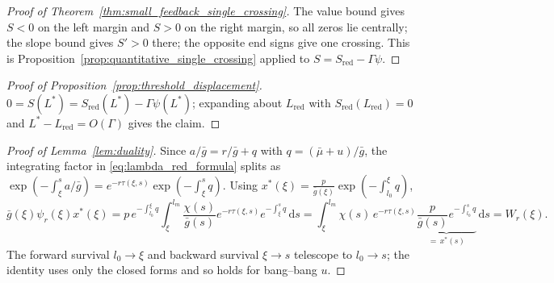 \documentclass[pdflatex,sn-mathphys-num]{sn-jnl}
\newcommand{\dd}{\,\mathrm{d}}
\theoremstyle{plain}
\theoremstyle{definition}
\theoremstyle{remark}
\begin{document}
\begin{proof}[Proof of Theorem~\ref{thm:small_feedback_single_crossing}]
The value bound gives $S<0$ on the left margin and $S>0$ on the right margin, so
all zeros lie centrally; the slope bound gives $S'>0$ there; the opposite end
signs give one crossing. This is Proposition~\ref{prop:quantitative_single_crossing}
applied to $S=S_{\mathrm{red}}-\Gamma\psi$.
\end{proof}

\begin{proof}[Proof of Proposition~\ref{prop:threshold_displacement}]
$0=S(L^*)=S_{\mathrm{red}}(L^*)-\Gamma\psi(L^*)$; expanding about
$L_{\mathrm{red}}$ with $S_{\mathrm{red}}(L_{\mathrm{red}})=0$ and
$L^*-L_{\mathrm{red}}=O(\Gamma)$ gives the claim.
\end{proof}

\begin{proof}[Proof of Lemma~\ref{lem:duality}]
Since $a/\bar g=r/\bar g+q$ with $q=(\bar\mu+u)/\bar g$, the integrating factor in
\eqref{eq:lambda_red_formula} splits as
$\exp(-\int_\xi^s a/\bar g)=e^{-r\tau(\xi,s)}\exp(-\int_\xi^s q)$. Using
$x^*(\xi)=\frac{p}{\bar g(\xi)}\exp(-\int_{l_0}^\xi q)$,
\[
\bar g(\xi)\psi_r(\xi)x^*(\xi)
=p\,e^{-\int_{l_0}^\xi q}\!\int_\xi^{l_m}\frac{\chi(s)}{\bar g(s)}
e^{-r\tau(\xi,s)}e^{-\int_\xi^s q}\dd s
=\int_\xi^{l_m}\chi(s)\,e^{-r\tau(\xi,s)}\underbrace{\frac{p}{\bar g(s)}
e^{-\int_{l_0}^s q}}_{=\,x^*(s)}\dd s
=W_r(\xi).
\]
The forward survival $l_0\!\to\!\xi$ and backward survival $\xi\!\to\!s$ telescope
to $l_0\!\to\!s$; the identity uses only the closed forms and so holds for
bang--bang $u$.
\end{proof}
\end{document}
